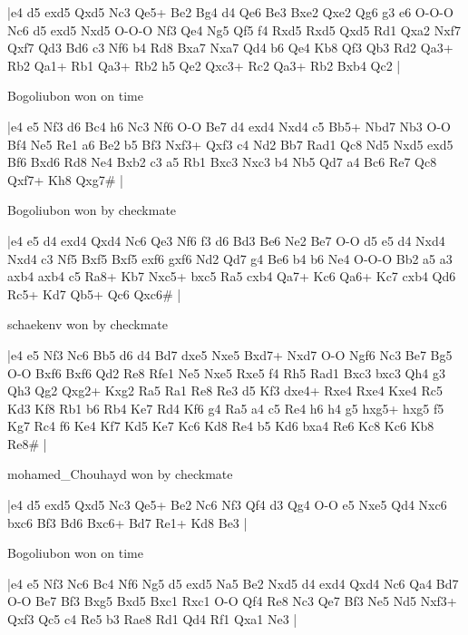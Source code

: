 \makegametitle
|e4 d5 exd5 Qxd5 Nc3 Qe5+ Be2 Bg4 d4 Qe6 Be3 Bxe2 Qxe2 Qg6 g3 e6 O-O-O Nc6 d5 exd5 Nxd5 O-O-O Nf3 Qe4 Ng5 Qf5 f4 Rxd5 Rxd5 Qxd5 Rd1 Qxa2 Nxf7 Qxf7 Qd3 Bd6 c3 Nf6 b4 Rd8 Bxa7 Nxa7 Qd4 b6 Qe4 Kb8 Qf3 Qb3 Rd2 Qa3+ Rb2 Qa1+ Rb1 Qa3+ Rb2 h5 Qe2 Qxc3+ Rc2 Qa3+ Rb2 Bxb4 Qc2  |

\showboard

Bogoliubon won on time

\makegametitle
|e4 e5 Nf3 d6 Bc4 h6 Nc3 Nf6 O-O Be7 d4 exd4 Nxd4 c5 Bb5+ Nbd7 Nb3 O-O Bf4 Ne5 Re1 a6 Be2 b5 Bf3 Nxf3+ Qxf3 c4 Nd2 Bb7 Rad1 Qc8 Nd5 Nxd5 exd5 Bf6 Bxd6 Rd8 Ne4 Bxb2 c3 a5 Rb1 Bxc3 Nxc3 b4 Nb5 Qd7 a4 Bc6 Re7 Qc8 Qxf7+ Kh8 Qxg7\#  |

\showboard

Bogoliubon won by checkmate

\makegametitle
|e4 e5 d4 exd4 Qxd4 Nc6 Qe3 Nf6 f3 d6 Bd3 Be6 Ne2 Be7 O-O d5 e5 d4 Nxd4 Nxd4 c3 Nf5 Bxf5 Bxf5 exf6 gxf6 Nd2 Qd7 g4 Be6 b4 b6 Ne4 O-O-O Bb2 a5 a3 axb4 axb4 c5 Ra8+ Kb7 Nxc5+ bxc5 Ra5 cxb4 Qa7+ Kc6 Qa6+ Kc7 cxb4 Qd6 Rc5+ Kd7 Qb5+ Qc6 Qxc6\#  |

\showboard

schaekenv won by checkmate

\makegametitle
|e4 e5 Nf3 Nc6 Bb5 d6 d4 Bd7 dxe5 Nxe5 Bxd7+ Nxd7 O-O Ngf6 Nc3 Be7 Bg5 O-O Bxf6 Bxf6 Qd2 Re8 Rfe1 Ne5 Nxe5 Rxe5 f4 Rh5 Rad1 Bxc3 bxc3 Qh4 g3 Qh3 Qg2 Qxg2+ Kxg2 Ra5 Ra1 Re8 Re3 d5 Kf3 dxe4+ Rxe4 Rxe4 Kxe4 Rc5 Kd3 Kf8 Rb1 b6 Rb4 Ke7 Rd4 Kf6 g4 Ra5 a4 c5 Re4 h6 h4 g5 hxg5+ hxg5 f5 Kg7 Rc4 f6 Ke4 Kf7 Kd5 Ke7 Kc6 Kd8 Re4 b5 Kd6 bxa4 Re6 Kc8 Kc6 Kb8 Re8\#  |

\showboard

mohamed\_Chouhayd won by checkmate

\makegametitle
|e4 d5 exd5 Qxd5 Nc3 Qe5+ Be2 Nc6 Nf3 Qf4 d3 Qg4 O-O e5 Nxe5 Qd4 Nxc6 bxc6 Bf3 Bd6 Bxc6+ Bd7 Re1+ Kd8 Be3  |

\showboard

Bogoliubon won on time

\makegametitle
|e4 e5 Nf3 Nc6 Bc4 Nf6 Ng5 d5 exd5 Na5 Be2 Nxd5 d4 exd4 Qxd4 Nc6 Qa4 Bd7 O-O Be7 Bf3 Bxg5 Bxd5 Bxc1 Rxc1 O-O Qf4 Re8 Nc3 Qe7 Bf3 Ne5 Nd5 Nxf3+ Qxf3 Qc5 c4 Re5 b3 Rae8 Rd1 Qd4 Rf1 Qxa1 Ne3  |

